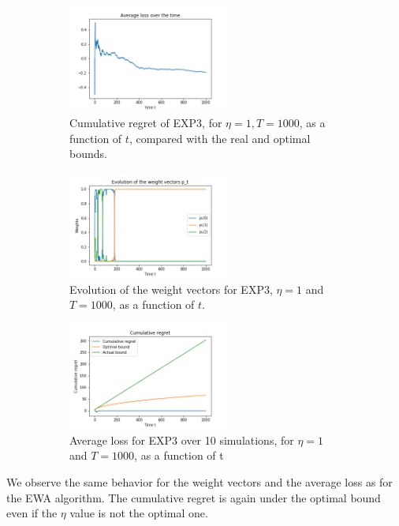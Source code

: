 \begin{enumerate}[resume]
\begin{solution}
    \begin{figure}[!h]
\centering
\begin{subfigure}{.28\textwidth}
  \centering
  \includegraphics[height=100pt]{image1/EXP3/EXP3_average_loss.png}
  \caption{Cumulative regret of EXP3, for $\eta = 1, T = 1000$, as a function of $t$, compared with the real and optimal bounds.}
  \label{fig:sub1}
\end{subfigure}%
\hspace{.5mm}
\begin{subfigure}{.28\textwidth}
  \centering
  \includegraphics[height=100pt]{image1/EXP3/EXP3_proba.png}
  \caption{Evolution of the weight vectors for EXP3, $\eta = 1$ and $T = 1000$, as a function of $t$.}
  \label{fig:sub2}
\end{subfigure}%
\hspace{.5mm}
\begin{subfigure}{.28\textwidth}
  \centering
  \includegraphics[height=100pt]{image1/EXP3/EXP3_comparison.png}
  \caption{Average loss for EXP3 over 10 simulations, for $\eta=1$ and $T=1000$, as a function of t}
  \label{fig:sub1}
\end{subfigure}%
\caption{}
\label{fig:cum-regrets}
\end{figure}

We observe the same behavior for the weight vectors and the average loss as for the EWA algorithm. The cumulative regret is again under the optimal bound even if the $\eta$ value is not the optimal one.


\end{solution}
\end{enumerate}
